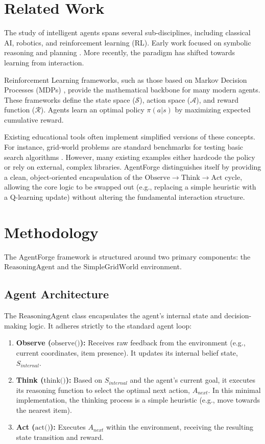 \documentclass[11pt,a4paper]{article}
\begin{document}
\section{Related Work}
The study of intelligent agents spans several sub-disciplines, including classical AI, robotics, and reinforcement learning (RL). Early work focused on symbolic reasoning and planning \cite{newell_ai}. More recently, the paradigm has shifted towards learning from interaction.

Reinforcement Learning frameworks, such as those based on Markov Decision Processes (MDPs) \cite{sutton_rl}, provide the mathematical backbone for many modern agents. These frameworks define the state space ($\mathcal{S}$), action space ($\mathcal{A}$), and reward function ($\mathcal{R}$). Agents learn an optimal policy $\pi(a|s)$ by maximizing expected cumulative reward.

Existing educational tools often implement simplified versions of these concepts. For instance, grid-world problems are standard benchmarks for testing basic search algorithms \cite{pathfinding_classic}. However, many existing examples either hardcode the policy or rely on external, complex libraries. AgentForge distinguishes itself by providing a clean, object-oriented encapsulation of the $\text{Observe} \rightarrow \text{Think} \rightarrow \text{Act}$ cycle, allowing the core logic to be swapped out (e.g., replacing a simple heuristic with a Q-learning update) without altering the fundamental interaction structure.

\section{Methodology}
The AgentForge framework is structured around two primary components: the $\text{ReasoningAgent}$ and the $\text{SimpleGridWorld}$ environment.

\subsection{Agent Architecture}
The $\text{ReasoningAgent}$ class encapsulates the agent's internal state and decision-making logic. It adheres strictly to the standard agent loop:
\begin{enumerate}
    \item \textbf{Observe ($\text{observe()}$):} Receives raw feedback from the environment (e.g., current coordinates, item presence). It updates its internal belief state, $S_{internal}$.
    \item \textbf{Think ($\text{think()}$):} Based on $S_{internal}$ and the agent's current goal, it executes its reasoning function to select the optimal next action, $A_{next}$. In this minimal implementation, the thinking process is a simple heuristic (e.g., move towards the nearest item).
    \item \textbf{Act ($\text{act()}$):} Executes $A_{next}$ within the environment, receiving the resulting state transition and reward.
\end{enumerate}
\end{document}

